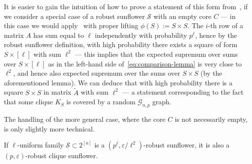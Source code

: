 It is easier to gain the intuition of how to prove a statement of this form from~, if we consider a special case of a robust sunflower $\mathcal{S}$ with an empty core $C$ --- in this case we would apply~ with proper lifting $\phi(S) := S\times S$. The $i$-th row of a matrix $A$ has sum equal to $\ell$ independently with probability $p^\ell$, hence by the robust sunflower definition, with high probability there exists a square of form $S \times [\ell]$ with sum $\ell^2$ --- this implies that the expected supremum over sums over $S\times [\ell]$ as in the left-hand side of~\eqref{eq:comparison-lemma} is very close to $\ell^2$, and hence also expected supremum over the sums over $S\times S$ (by the aforementioned lemma). We can deduce that with high probability there is a square $S\times S$ in matrix $\tilde{A}$ with sum $\ell^2$ --- a statement corresponding to the fact that some clique $K_S$ is covered by a random $\mathcal{G}_{n,p}$ graph.

The handling of the more general case, where the core $C$ is not necessarily empty, is only slightly more technical.

\begin{lemma}
\label{lem:robust-sunflower-is-clique-sunflower}
    If $\ell$-uniform family $\mathcal{S} \subset 2^{[n]}$ is a $(p^\ell, \varepsilon/\ell^2)$-robust sunflower, it is also a $(p, \varepsilon)$-robust clique sunflower.
\end{lemma}

